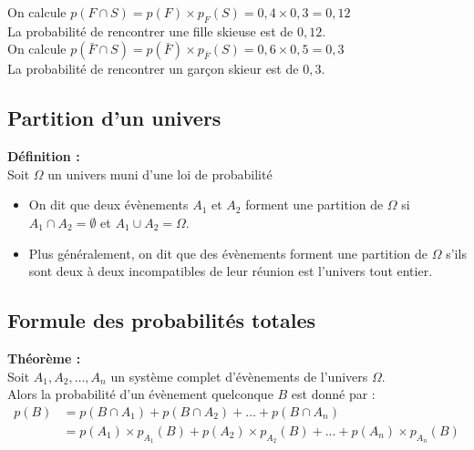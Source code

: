 \documentclass{article}
\begin{document}
On calcule $p(F\cap S)=p(F)\times p_F(S)=0,4\times0,3=0,12$ \\
La probabilité de rencontrer une fille skieuse est de $0,12$. \\

On calcule $p(\bar F\cap S)=p(\bar F)\times p_{\bar{F}}(S)=0,6\times0,5=0,3$ \\
La probabilité de rencontrer un garçon skieur est de $0,3$.

\subsection{Partition d'un univers}

\begin{mdframed}[style=definitionStyle]
	\textbf{Définition :} ~\\
	Soit $\Omega$ un univers muni d'une loi de probabilité
	\vspace{-4pt}
	\begin{itemize}
		\item On dit que deux évènements $A_1$ et $A_2$ forment une partition de $\Omega$ si $A_1\cap A_2=\emptyset$ et $A_1\cup A_2=\Omega$.
		\item Plus généralement, on dit que des évènements forment une partition de $\Omega$ s'ils sont deux à deux
		      incompatibles de leur réunion est l'univers tout entier.
	\end{itemize}
\end{mdframed}

\subsection{Formule des probabilités totales}

\begin{mdframed}[style=proprieteStyle]
	\textbf{Théorème :} ~\\
	Soit $A_1,A_2,\dots,A_n$ un système complet d'évènements de l'univers $\Omega$. \\
	Alors la probabilité d'un évènement quelconque $B$ est donné par :
	\vspace{-8pt}
	\begin{equation*}
		\begin{split}
			p(B) & =p(B\cap A_1)+p(B\cap A_2)+\dots+p(B\cap A_n)                                 \\
			     & = p(A_1)\times p_{A_1}(B)+p(A_2)\times p_{A_2}(B)+...+p(A_n)\times p_{A_n}(B)
		\end{split}
	\end{equation*}
\end{mdframed}
\end{document}
